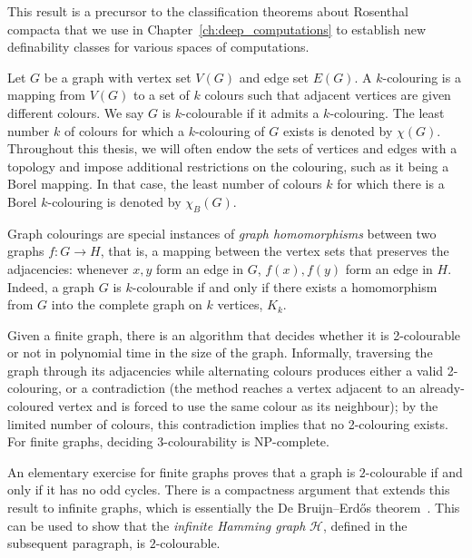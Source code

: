 This result is a precursor to the classification theorems about Rosenthal compacta that we use in Chapter~\ref{ch:deep_computations} to establish new definability classes for various spaces of computations.

Let $G$ be a graph with vertex set $V(G)$ and edge set $E(G)$.
A $k$-colouring is a mapping from $V(G)$ to a set of $k$ colours such that adjacent vertices are given different colours.
We say $G$ is $k$-colourable if it admits a $k$-colouring.
The least number $k$ of colours for which a $k$-colouring of $G$ exists is denoted by $\chi(G)$.
Throughout this thesis, we will often endow the sets of vertices and edges with a topology and impose additional restrictions on the colouring, such as it being a Borel mapping.
In that case, the least number of colours $k$ for which there is a Borel $k$-colouring is denoted by $\chi_B(G)$.

Graph colourings are special instances of \emph{graph homomorphisms} between two graphs $f\colon G\to H$, that is, a mapping between the vertex sets that preserves the adjacencies: whenever $x,y$ form an edge in $G$, $f(x),f(y)$ form an edge in $H$.
Indeed, a graph $G$ is $k$-colourable if and only if there exists a homomorphism from $G$ into the complete graph on $k$ vertices, $K_k$.

Given a finite graph, there is an algorithm that decides whether it is 2-colourable or not in polynomial time in the size of the graph.
Informally, traversing the graph through its adjacencies while alternating colours produces either a valid 2-colouring, or a contradiction (the method reaches a vertex adjacent to an already-coloured vertex and is forced to use the same colour as its neighbour); by the limited number of colours, this contradiction implies that no 2-colouring exists.
For finite graphs, deciding $3$-colourability is NP-complete.

An elementary exercise for finite graphs proves that a graph is $2$-colourable if and only if it has no odd cycles.
There is a compactness argument that extends this result to infinite graphs, which is essentially the De Bruijn--Erd\H{o}s theorem~\cite[14.1.27]{bondy2008graph}.
This can be used to show that the \emph{infinite Hamming graph} $\mathcal H$, defined in the subsequent paragraph, is $2$-colourable.

